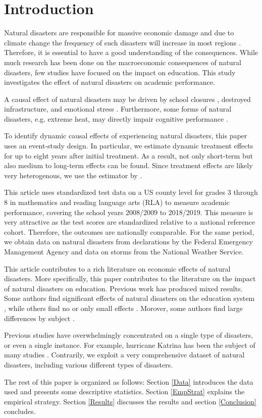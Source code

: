 
\section{Introduction}

Natural disasters are responsible for massive economic damage and due to climate change the frequency of such disasters will increase in most regions \citep{IPCC_2021}. Therefore, it is essential to have a good understanding of the consequences. While much research has been done on the macroeconomic consequences of natural disasters, few studies have focused on the impact on education. This study investigates the effect of natural disasters on academic performance.

A causal effect of natural disasters may be driven by school closures \citep{Grewening_2020}, destroyed infrastructure, and emotional stress \citep{Vogel_2016}. Furthermore, some forms of natural disasters, e.g. extreme heat, may directly impair cognitive performance \citep{Ramsey_1995}.

To identify dynamic causal effects of experiencing natural disasters, this paper uses an event-study design. In particular, we estimate dynamic treatment effects for up to eight years after initial treatment. As a result, not only short-term but also medium to long-term effects can be found. Since treatment effects are likely very heterogenous, we use the estimator by \cite{Sun_2021}. 

This article uses standardized test data on a US county level for grades 3 through 8 in mathematics and reading language arts (RLA) to measure academic performance, covering the school years 2008/2009 to 2018/2019. This measure is very attractive as the test scores are standardized relative to a national reference cohort. Therefore, the outcomes are nationally comparable. For the same period, we obtain data on natural disasters from declarations by the Federal Emergency Management Agency and data on storms from the National Weather Service.

This article contributes to a rich literature on economic effects of natural disasters. More specifically, this paper contributes to the literature on the impact of natural disasters on education. Previous work has produced mixed results. Some authors find significant effects of natural disasters on the education system \citep{Holmes_2002, Cuaresma_2010, Sacerdote_2012, Goodman_2020}, while others find no or only small effects \citep{Baggerly_2008, Pane_2008}. Morover, some authors find large differences by subject \citep{Spencer_2016}.

Previous studies have overwhelmingly concentrated on a single type of disasters, or even a single instance. For example, hurricane Katrina has been the subject of many studies \citep[e.g.][]{Sacerdote_2012, Deryugina_2018}. Contrarily, we exploit a very comprehensive dataset of natural disasters, including various different types of disasters. 

The rest of this paper is organized as follows: Section \ref{Data} introduces the data used and presents some descriptive statistics. Section \ref{EmpStrat} explains the empirical strategy. Section \ref{Results} discusses the results and section \ref{Conclusion} concludes.

